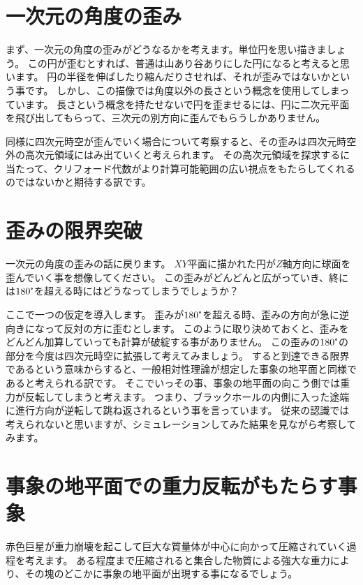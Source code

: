 \documentclass[a4paper,12pt,notitlepage]{jsreport}
\begin{document}
\section{一次元の角度の歪み}

まず、一次元の角度の歪みがどうなるかを考えます。単位円を思い描きましょう。
この円が歪むとすれば、普通は山あり谷ありにした円になると考えると思います。
円の半径を伸ばしたり縮んだりさせれば、それが歪みではないかという事です。
しかし、この描像では角度以外の長さという概念を使用してしまっています。
長さという概念を持たせないで円を歪ませるには、円に二次元平面を飛び出してもらって、三次元の別方向に歪んでもらうしかありません。

同様に四次元時空が歪んでいく場合について考察すると、その歪みは四次元時空外の高次元領域にはみ出ていくと考えられます。
その高次元領域を探求するに当たって、クリフォード代数がより計算可能範囲の広い視点をもたらしてくれるのではないかと期待する訳です。

\section{歪みの限界突破}

一次元の角度の歪みの話に戻ります。
$XY$平面に描かれた円が$Z$軸方向に球面を歪んでいく事を想像してください。
この歪みがどんどんと広がっていき、終には$180\tcdegree$を超える時にはどうなってしまうでしょうか？

ここで一つの仮定を導入します。
歪みが$180\tcdegree$を超える時、歪みの方向が急に逆向きになって反対の方に歪むとします。
このように取り決めておくと、歪みをどんどん加算していっても計算が破綻する事がありません。
この歪みの$180\tcdegree$の部分を今度は四次元時空に拡張して考えてみましょう。
すると到達できる限界であるという意味からすると、一般相対性理論が想定した事象の地平面と同様であると考えられる訳です。
そこでいっその事、事象の地平面の向こう側では重力が反転してしまうと考えます。
つまり、ブラックホールの内側に入った途端に進行方向が逆転して跳ね返されるという事を言っています。
従来の認識では考えられないと思いますが、シミュレーションしてみた結果を見ながら考察してみます。

\section{事象の地平面での重力反転がもたらす事象}

赤色巨星が重力崩壊を起こして巨大な質量体が中心に向かって圧縮されていく過程を考えます。
ある程度まで圧縮されると集合した物質による強大な重力により、その塊のどこかに事象の地平面が出現する事になるでしょう。
\end{document}
